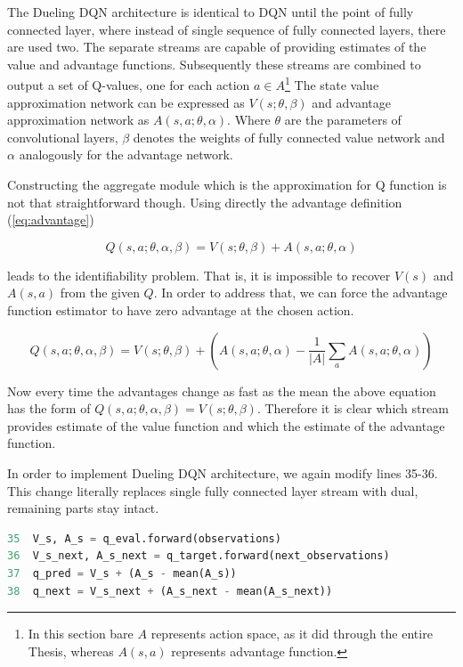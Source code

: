 The Dueling DQN architecture is identical to DQN until the point of fully connected layer, where instead of single sequence of fully
connected layers, there are used two. The separate streams are capable of providing estimates of the value and advantage functions.
Subsequently these streams are combined to output a set of Q-values, one for each action $a \in A$\footnote{In this section bare $A$
represents action space, as it did through the entire Thesis, whereas $A(s, a)$ represents advantage function.}
The state value approximation network can be expressed as $V(s; \theta, \beta)$ and advantage approximation network as $A(s, a; \theta,
\alpha)$. Where $\theta$ are the parameters of convolutional layers, $\beta$ denotes the weights of fully connected value network and
$\alpha$ analogously for the advantage network.

Constructing the aggregate module which is the approximation for Q function is not that straightforward though. Using directly the advantage definition (\ref{eq:advantage})

\begin{equation}
    Q(s, a; \theta, \alpha, \beta) = V(s; \theta, \beta) + A(s, a; \theta, \alpha)
\end{equation}

leads to the identifiability problem. That is, it is impossible to recover $V(s)$ and $A(s, a)$ from the given $Q$. In order to address
that, we can force the advantage function estimator to have zero advantage at the chosen action.

\begin{equation}
    Q(s, a; \theta, \alpha, \beta) = V(s; \theta, \beta) + \left(A(s, a; \theta, \alpha) - \frac{1}{|A|} \sum_a A(s, a; \theta, \alpha)\right)
\end{equation}

Now every time the advantages change as fast as the mean the above equation has the form of $Q(s, a; \theta, \alpha, \beta) = V(s; \theta,
\beta)$. Therefore it is clear which stream provides estimate of the value function and which the estimate of the advantage function.

In order to implement Dueling DQN architecture, we again modify lines 35-36. This change literally replaces single fully connected layer stream with dual, remaining parts stay intact.

\begin{lstlisting}[language=Python, caption={Dueling Deep Q-learning modification}]
35  V_s, A_s = q_eval.forward(observations)
36  V_s_next, A_s_next = q_target.forward(next_observations)
37  q_pred = V_s + (A_s - mean(A_s))
38  q_next = V_s_next + (A_s_next - mean(A_s_next))
\end{lstlisting}

